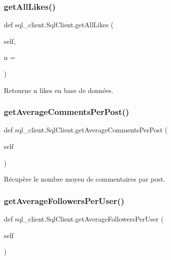 \subsubsection{\texorpdfstring{get\+All\+Likes()}{getAllLikes()}}
{\footnotesize\ttfamily def sql\+\_\+client.\+Sql\+Client.\+get\+All\+Likes (\begin{DoxyParamCaption}\item[{}]{self,  }\item[{}]{n = {} }\end{DoxyParamCaption})}

\begin{DoxyVerb}Retourne n likes en base de données.
\end{DoxyVerb}
 \mbox{\label{classsql__client_1_1_sql_client_a21df01dcb35afd430c1e03623d393227}} 
\subsubsection{\texorpdfstring{get\+Average\+Comments\+Per\+Post()}{getAverageCommentsPerPost()}}
{\footnotesize\ttfamily def sql\+\_\+client.\+Sql\+Client.\+get\+Average\+Comments\+Per\+Post (\begin{DoxyParamCaption}\item[{}]{self }\end{DoxyParamCaption})}

\begin{DoxyVerb}Récupère le nombre moyen de commentaires par post.
\end{DoxyVerb}
 \mbox{\label{classsql__client_1_1_sql_client_a6f0328bf169e37403176157b9899603e}} 
\subsubsection{\texorpdfstring{get\+Average\+Followers\+Per\+User()}{getAverageFollowersPerUser()}}
{\footnotesize\ttfamily def sql\+\_\+client.\+Sql\+Client.\+get\+Average\+Followers\+Per\+User (\begin{DoxyParamCaption}\item[{}]{self }\end{DoxyParamCaption})}

